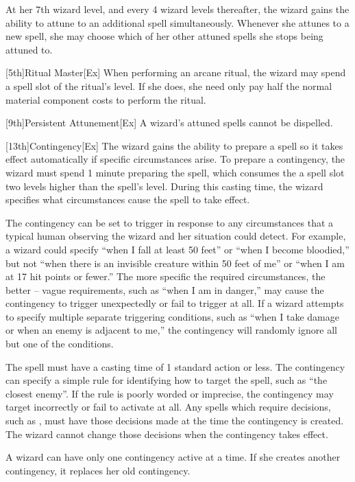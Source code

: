 At her 7th wizard level, and every 4 wizard levels thereafter, the wizard gains the ability to attune to an additional spell simultaneously.
Whenever she attunes to a new spell, she may choose which of her other attuned spells she stops being attuned to.

[5th]{Ritual Master}[Ex]
When performing an arcane ritual, the wizard may spend a spell slot of the ritual's level.
If she does, she need only pay half the normal material component costs to perform the ritual.

[9th]{Persistent Attunement}[Ex]
A wizard's attuned spells cannot be dispelled.

[13th]{Contingency}[Ex]
The wizard gains the ability to prepare a spell so it takes effect automatically if specific circumstances arise.
To prepare a contingency, the wizard must spend 1 minute preparing the spell, which consumes the a spell slot two levels higher than the spell's level.
During this casting time, the wizard specifies what circumstances cause the spell to take effect.

The contingency can be set to trigger in response to any circumstances that a typical human observing the wizard and her situation could detect.
For example, a wizard could specify ``when I fall at least 50 feet'' or ``when I become bloodied,'' but not ``when there is an invisible creature within 50 feet of me'' or ``when I am at 17 hit points or fewer.'' The more specific the required circumstances, the better -- vague requirements, such as ``when I am in danger,'' may cause the contingency to trigger unexpectedly or fail to trigger at all.
If a wizard attempts to specify multiple separate triggering conditions, such as ``when I take damage or when an enemy is adjacent to me,'' the contingency will randomly ignore all but one of the conditions.

The spell must have a casting time of 1 standard action or less.
The contingency can specify a simple rule for identifying how to target the spell, such as ``the closest enemy''.
If the rule is poorly worded or imprecise, the contingency may target incorrectly or fail to activate at all.
Any spells which require decisions, such as , must have those decisions made at the time the contingency is created.
The wizard cannot change those decisions when the contingency takes effect.

A wizard can have only one contingency active at a time.
If she creates another contingency, it replaces her old contingency.

